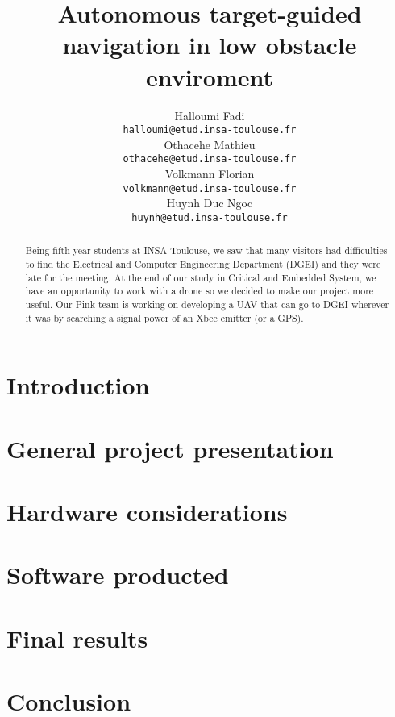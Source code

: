 \documentclass[10pt,a4paper,titlepage]{report}
\author{Halloumi Fadi\\\texttt{halloumi@etud.insa-toulouse.fr}\\
Othacehe Mathieu\\\texttt{othacehe@etud.insa-toulouse.fr}\\
Volkmann Florian\\\texttt{volkmann@etud.insa-toulouse.fr}\\
Huynh Duc Ngoc\\\texttt{huynh@etud.insa-toulouse.fr}}
\title{Autonomous target-guided navigation in low obstacle enviroment}
\begin{document}
\maketitle %
\begin{abstract} %
Being fifth year students at INSA Toulouse, we saw that many visitors had difficulties to find the Electrical and Computer Engineering Department (DGEI) and they were late for the meeting. At the end of our study in Critical and Embedded System, we have an opportunity to work with a drone so we decided to make our project more useful. Our Pink team is working on developing a UAV that can go to DGEI wherever it was by searching a signal power of an Xbee emitter (or a GPS).
\end{abstract}

\tableofcontents %
\clearpage


\chapter{Introduction}

\chapter{General project presentation}

\chapter{Hardware considerations}

\chapter{Software producted}

\chapter{Final results}


\chapter{Conclusion}
\end{document}
